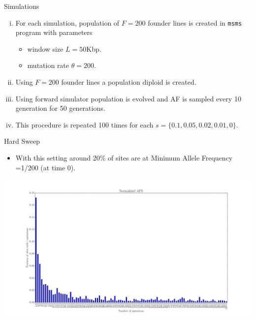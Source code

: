 \documentclass[t]{beamer} %
\begin{document}
\begin{frame}{Simulations}
\begin{enumerate}[(i)]
\item For each simulation, population of $F=200$ founder lines is created in  \texttt{msms} program with parameters 
\begin{itemize}
\item window size $L=50$Kbp.
\item mutation rate $\theta=200$.
\end{itemize}

\item Using $F=200$ founder lines a population diploid is created.
\item Using forward simulator population is evolved and AF is sampled every 10 generation for 50 generations. 
\item This procedure is repeated 100 times for each $s=\{0.1, 0.05, 0.02, 0.01, 0\}$.
\end{enumerate}
\end{frame}




\begin{frame}{Hard Sweep}
\begin{itemize}
\item With this setting around 20\% of sites are at Minimum Allele Frequency =1/200  (at time 0).
\end{itemize}
\hspace{-0in}\includegraphics[scale=0.17]{AFS}
\end{frame}
\end{document}
